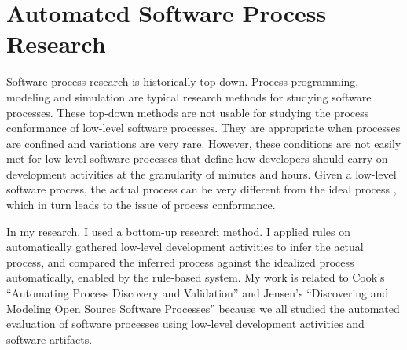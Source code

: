 
\section{Automated Software Process Research}
\label{sec:related-automation}
Software process research is historically top-down. Process
programming\cite{Sutton:95}, modeling\cite{Curtis:92} and 
simulation\cite{Turnu:04,Jensen:05} are typical research 
methods for studying software processes. These top-down
methods are not usable for studying the process conformance of 
low-level software processes. They are appropriate when 
processes are confined and variations are very rare. 
However, these conditions are not easily met for low-level
software processes that define how developers should carry
on development activities at the granularity of minutes
and hours. Given a low-level software process, the actual 
process can be very different from the ideal process 
\cite{csdl-98-04,csdl2-06-01,csdl2-01-12}, which in turn leads 
to the issue of process conformance. 

In my research, I used a bottom-up research method. I applied 
rules on automatically gathered low-level development activities 
to infer the actual process, and compared the inferred process 
against the idealized process automatically, enabled by the 
rule-based system. My work is related to Cook's ``Automating 
Process Discovery and Validation'' and Jensen's ``Discovering 
and Modeling Open Source Software Processes'' because we all 
studied the automated evaluation of software processes using 
low-level development activities and software artifacts. 

%

